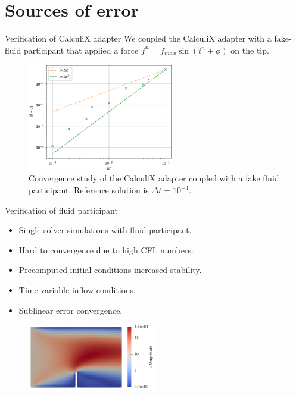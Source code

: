 \documentclass[
  english,            %
  aspectratio=43,    %
]{tumbeamer}
\begin{document}
\section{Sources of error}
\begin{frame}{Verification of CalculiX adapter}
\vspace{5pt}
We coupled the CalculiX adapter with a fake-fluid participant that applied a force $f^n = f_{max} \sin(t^n + \phi)$ on the tip.
\vspace{5pt}
\begin{figure}[!ht]
    \centering
    \includegraphics[width=0.57\textwidth]{resources/fake_fluid.png}
    \caption{Convergence study of the CalculiX adapter coupled with a fake fluid participant. Reference solution is $\Delta t = 10^{-4}$.}
    \label{fig:fake-fluid}
\end{figure}
\end{frame}

\begin{frame}{Verification of fluid participant}
    \begin{itemize}
        \setlength\itemsep{10pt}
        \item Single-solver simulations with fluid participant. 
        \item Hard to convergence due to high CFL numbers.
        \item Precomputed initial conditions increased stability.
        \item Time variable inflow conditions.
        \item Sublinear error convergence.
    \end{itemize}
    \vspace{5pt}
    \begin{figure}
    \centering
    \includegraphics[width=0.5\textwidth]{resources/test_fluid_participant.png}
    \end{figure}
\end{frame}
\end{document}
